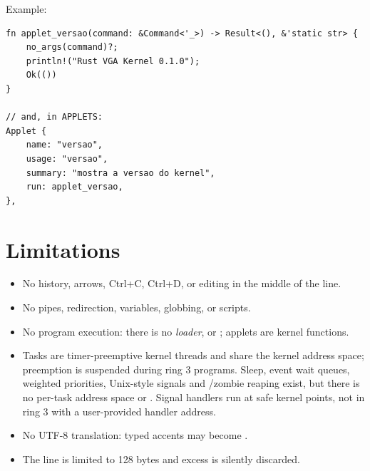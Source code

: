 Example:

\begin{lstlisting}[caption={Skeleton of a new applet.},label={lst:novocomando}]
fn applet_versao(command: &Command<'_>) -> Result<(), &'static str> {
    no_args(command)?;
    println!("Rust VGA Kernel 0.1.0");
    Ok(())
}

// and, in APPLETS:
Applet {
    name: "versao",
    usage: "versao",
    summary: "mostra a versao do kernel",
    run: applet_versao,
},
\end{lstlisting}

\section{Limitations}

\begin{itemize}
  \item No history, arrows, Ctrl+C, Ctrl+D, or editing in the middle of the
        line.
  \item No pipes, redirection, variables, globbing, or scripts.
  \item No program execution: there is no \emph{loader},  or
        ; applets are kernel functions.
  \item Tasks are timer-preemptive kernel threads and share the kernel
        address space; preemption is suspended during ring 3 programs. Sleep,
        event wait queues, weighted priorities, Unix-style signals and
        /zombie reaping exist, but there is no per-task address
        space or . Signal handlers run at safe kernel points, not
        in ring 3 with a user-provided handler address.
  \item No UTF-8 translation: typed accents may become .
  \item The line is limited to 128 bytes and excess is silently discarded.
\end{itemize}
